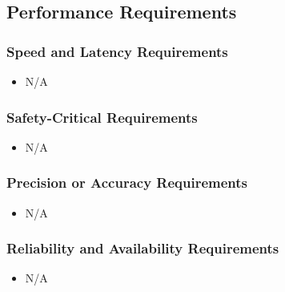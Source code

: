 \documentclass[12pt]{article}
\newcounter{nfrnum} %
\begin{document}
\subsection{Performance Requirements}
  \subsubsection{Speed and Latency Requirements}
    \noindent\begin{itemize}
		\item N/A
    \end{itemize}
  \subsubsection{Safety-Critical Requirements}
    \noindent\begin{itemize}
      \item N/A
    \end{itemize}
  \subsubsection{Precision or Accuracy Requirements}
    \noindent\begin{itemize}
		\item N/A
    \end{itemize}
  \subsubsection{Reliability and Availability Requirements}
    \noindent\begin{itemize}
		\item N/A
    \end{itemize}
\end{document}
